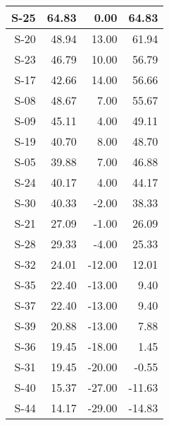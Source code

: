 \begin{tabular}{ | r | r | r | r | }
    \hline
                  S-25  &           64.83  &            0.00  &           64.83  \\
    \hline
                  S-20  &           48.94  &           13.00  &           61.94  \\
    \hline
                  S-23  &           46.79  &           10.00  &           56.79  \\
    \hline
                  S-17  &           42.66  &           14.00  &           56.66  \\
    \hline
                  S-08  &           48.67  &            7.00  &           55.67  \\
    \hline
                  S-09  &           45.11  &            4.00  &           49.11  \\
    \hline
                  S-19  &           40.70  &            8.00  &           48.70  \\
    \hline
                  S-05  &           39.88  &            7.00  &           46.88  \\
    \hline
                  S-24  &           40.17  &            4.00  &           44.17  \\
    \hline
                  S-30  &           40.33  &           -2.00  &           38.33  \\
    \hline
                  S-21  &           27.09  &           -1.00  &           26.09  \\
    \hline
                  S-28  &           29.33  &           -4.00  &           25.33  \\
    \hline
                  S-32  &           24.01  &          -12.00  &           12.01  \\
    \hline
                  S-35  &           22.40  &          -13.00  &            9.40  \\
    \hline
                  S-37  &           22.40  &          -13.00  &            9.40  \\
    \hline
                  S-39  &           20.88  &          -13.00  &            7.88  \\
    \hline
                  S-36  &           19.45  &          -18.00  &            1.45  \\
    \hline
                  S-31  &           19.45  &          -20.00  &           -0.55  \\
    \hline
                  S-40  &           15.37  &          -27.00  &          -11.63  \\
    \hline
                  S-44  &           14.17  &          -29.00  &          -14.83  \\

\end{tabular}
